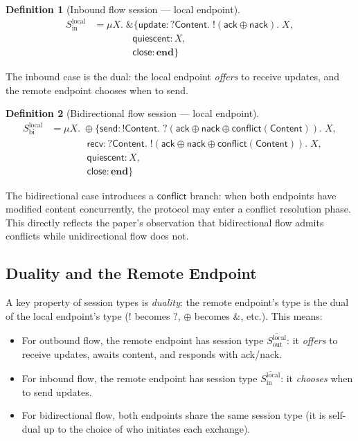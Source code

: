 \documentclass[11pt]{article}
\newtheorem{definition}{Definition}
\newcommand{\sess}[1]{\mathsf{#1}}
\newcommand{\tp}[1]{\mathsf{#1}}
\newcommand{\kw}[1]{\mathbf{#1}}
\begin{document}
\begin{definition}[Inbound flow session --- local endpoint]
\begin{align*}
  S_{\text{in}}^{\text{local}} &= \mu X.\; \& \{
    \sess{update}: ?\tp{Content}.\; !(\sess{ack} \oplus \sess{nack}).\; X, \\
    &\qquad\quad\;\;\;\,
    \sess{quiescent}: X, \\
    &\qquad\quad\;\;\;\,
    \sess{close}: \kw{end}
  \}
\end{align*}
\end{definition}

The inbound case is the dual: the local endpoint \emph{offers} to receive
updates, and the remote endpoint chooses when to send.

\begin{definition}[Bidirectional flow session --- local endpoint]
\begin{align*}
  S_{\text{bi}}^{\text{local}} &= \mu X.\; \oplus \{
    \sess{send}: !\tp{Content}.\; ?(\sess{ack} \oplus \sess{nack} \oplus \sess{conflict}(\tp{Content})).\; X, \\
    &\qquad\quad\;\;\,
    \sess{recv}: ?\tp{Content}.\; !(\sess{ack} \oplus \sess{nack} \oplus \sess{conflict}(\tp{Content})).\; X, \\
    &\qquad\quad\;\;\,
    \sess{quiescent}: X, \\
    &\qquad\quad\;\;\,
    \sess{close}: \kw{end}
  \}
\end{align*}
\end{definition}

The bidirectional case introduces a $\sess{conflict}$ branch: when both
endpoints have modified content concurrently, the protocol may enter a conflict
resolution phase. This directly reflects the paper's observation that
bidirectional flow admits conflicts while unidirectional flow does not.

\subsection{Duality and the Remote Endpoint}

A key property of session types is \emph{duality}: the remote endpoint's type
is the dual of the local endpoint's type ($!$ becomes $?$, $\oplus$ becomes
$\&$, etc.). This means:

\begin{itemize}
  \item For outbound flow, the remote endpoint has session type
    $\overline{S_{\text{out}}^{\text{local}}}$: it \emph{offers} to receive
    updates, awaits content, and responds with ack/nack.
  \item For inbound flow, the remote endpoint has session type
    $\overline{S_{\text{in}}^{\text{local}}}$: it \emph{chooses} when to send
    updates.
  \item For bidirectional flow, both endpoints share the same session type (it
    is self-dual up to the choice of who initiates each exchange).
\end{itemize}
\end{document}
